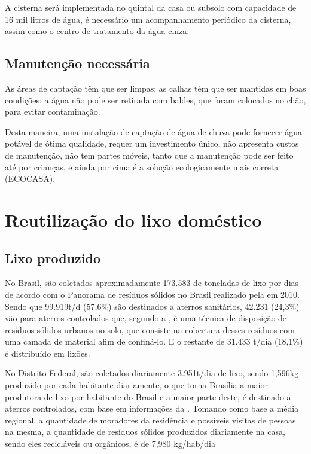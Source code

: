 A cisterna será implementada no quintal da casa ou subsolo com capacidade de 16 mil litros de água, é necessário um acompanhamento periódico da cisterna, assim como o centro de tratamento da água cinza.

\subsection{Manutenção necessária}

	As áreas de captação têm que ser limpas; as calhas têm que ser mantidas em boas condições; a água não pode ser retirada com baldes, que foram colocados no chão, para evitar contaminação.

	Desta maneira, uma instalação de captação de água de chuva pode fornecer água potável de ótima qualidade, requer um investimento único, não apresenta custos de manutenção, não tem partes móveis, tanto que a manutenção pode ser feito até por crianças, e ainda por cima é a solução ecologicamente mais correta (ECOCASA).

\section{Reutilização do lixo doméstico}

\subsection{Lixo produzido}

	No Brasil, são coletados aproximadamente 173.583 de toneladas de lixo por dias de acordo com o Panorama de resíduos sólidos no Brasil realizado pela \cite{ABRELPE} em 2010. Sendo que 99.919t/d (57,6\%) são destinados a aterros sanitários, 42.231 (24,3\%) vão para aterros controlados que, segundo a \cite{NBR8849:1985}, é uma técnica de disposição de resíduos sólidos urbanos no solo, que consiste na cobertura desses resíduos com uma camada de material afim de confiná-lo. E o restante de 31.433 t/dia (18,1\%) é distribuído em lixões.

	No Distrito Federal, são coletados diariamente 3.951t/dia de lixo, sendo 1,596kg produzido por cada habitante diariamente, o que torna Brasília a maior produtora de lixo por habitante do Brasil e a maior parte deste, é destinado a aterros controlados, com base em informações da \cite{ABRELPE}. Tomando como base a média regional, a quantidade de moradores da residência e possíveis visitas de pessoas na mesma, a quantidade de resíduos sólidos produzidos diariamente na casa, sendo eles recicláveis ou orgânicos, é de 7,980 kg/hab/dia

